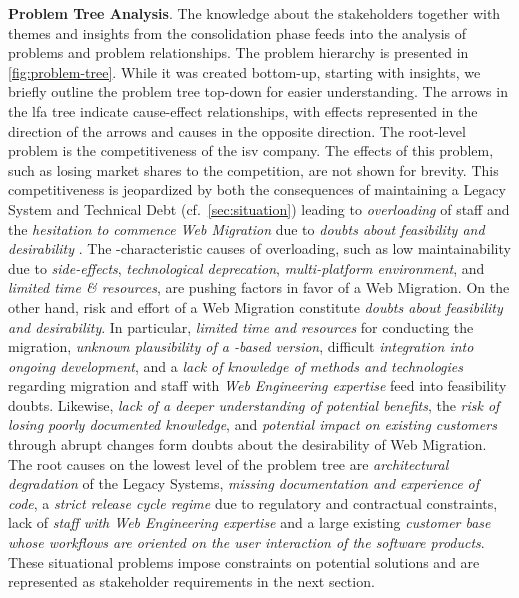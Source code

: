 \textbf{Problem Tree Analysis}.
The knowledge about the stakeholders together with themes and insights from the consolidation phase feeds into the analysis of problems and problem relationships.
The problem hierarchy is presented in \cref{fig:problem-tree}.
While it was created bottom-up, starting with insights, we briefly outline the problem tree top-down for easier understanding.
The arrows in the \gls{lfa} tree indicate cause-effect relationships, with effects represented in the direction of the arrows and causes in the opposite direction.
The root-level problem is the competitiveness of the \gls{isv} company. The effects of this problem, such as losing market shares to the competition, are not shown for brevity.
This competitiveness is jeopardized by both the consequences of maintaining a \gls{Legacy System} and \gls{Technical Debt} (cf.~\cref{sec:situation}) leading to \emph{overloading} of staff and the \emph{hesitation to commence \gls{Web Migration}} due to \emph{doubts about feasibility and desirability} \autocite[cf.~also to resistance from organization in][]{Khadka2014ProfessionalsModernization,Sneed2010ReMiP}.
The -characteristic causes of overloading, such as low maintainability due to \emph{side-effects}, \emph{technological deprecation}, \emph{multi-platform environment}, and \emph{limited time \& resources}, are pushing factors in favor of a \gls{Web Migration}.
On the other hand, risk and effort of a \gls{Web Migration} constitute \emph{doubts about feasibility and desirability}.
In particular, \emph{limited time and resources} for conducting the migration, \emph{unknown plausibility of a -based version}, difficult \emph{integration into ongoing development}, and a \emph{lack of knowledge of methods and technologies} regarding migration and staff with \emph{\gls{Web Engineering} expertise} feed into feasibility doubts.
Likewise, \emph{lack of a deeper understanding of potential benefits}, the \emph{risk of losing poorly documented knowledge}, and \emph{potential impact on existing customers} through abrupt changes form doubts about the desirability of \gls{Web Migration}.
The root causes on the lowest level of the problem tree are \emph{architectural degradation} of the \glspl{Legacy System}, \emph{missing documentation and experience of  code}, a \emph{strict release cycle regime} due to regulatory and contractual constraints, lack of \emph{staff with \gls{Web Engineering} expertise} and a large existing \emph{customer base whose workflows are oriented on the user interaction of the software products}.
These situational problems impose constraints on potential solutions and are represented as stakeholder requirements in the next section.


